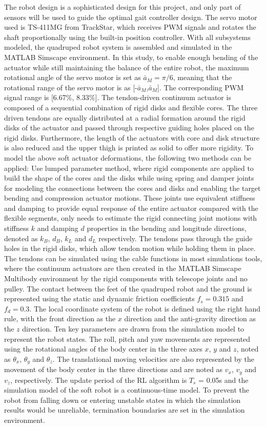 The robot design is a sophisticated design for this project, and only part of sensors will be used to guide the optimal gait controller design. The servo motor used is TS-411MG from TrackStar, which receives \ac{PWM} signals and rotates the shaft proportionally using the built-in position controller.  With all subsystems modeled, the quadruped robot system is assembled and simulated in the MATLAB Simscape environment. In this study, to enable enough bending of the actuator while still maintaining the balance of the entire robot, the maximum rotational angle of the servo motor is set as $\bar{a}_M = \pi/6$, meaning that the rotational range of the servo motor is as [-$\bar{a}_M$,$\bar{a}_M$]. The corresponding \ac{PWM} signal range is [6.67\%, 8.33\%]. The tendon-driven continuum actuator is composed of a sequential combination of rigid disks and flexible cores. The three driven tendons are equally distributed at a radial formation around the rigid disks of the actuator and passed through respective guiding holes placed on the rigid disks. Furthermore, the length of the actuators with core and disk structure is also reduced and the upper thigh is printed as solid to offer more rigidity. To model the above soft actuator deformations, the following two methods can be applied: Use lumped parameter method, where rigid components are applied to build the shape of the cores and the disks while using spring and damper joints for modeling the connections between the cores and disks and enabling the target bending and compression actuator motions. These joints use equivalent stiffness and damping to provide equal response of the entire actuator compared with the flexible segments, only needs to estimate the rigid connecting joint motions with stiffness $k$ and damping $d$ properties in the bending and longitude directions, denoted as $k_B$, $d_B$, $k_L$ and $d_L$ respectively. The tendons pass through the guide holes in the rigid disks, which allow tendon motion while holding them in place. The tendons can be simulated using the cable functions in most simulations tools, where the continuum actuators are then created in the MATLAB Simscape Multibody environment by the rigid components with telescope joints and no pulley. The contact between the feet of the quadruped robot and the ground is represented using the static and dynamic friction coefficients $f_s=0.315$ and $f_d=0.3$. The local coordinate system of the robot is defined using the right hand rule, with the front direction as the $x$ direction and the anti-gravity direction as the $z$ direction. Ten key parameters are drawn from the simulation model to represent the robot states. The roll, pitch and yaw movements are represented using the rotational angles of the body center in the three axes $x$, $y$ and $z$, noted as $\theta_x$, $\theta_y$ and $\theta_z$. The translational moving velocities are also represented by the movement of the body center in the three directions and are noted as $v_x$, $v_y$ and $v_z$, respectively. The update period of the RL algorithm is $T_s$ = 0.05s and the simulation model of the soft robot is a continuous-time model. To prevent the robot from falling down or entering unstable states in which the simulation results would be unreliable, termination boundaries are set in the simulation environment. 
